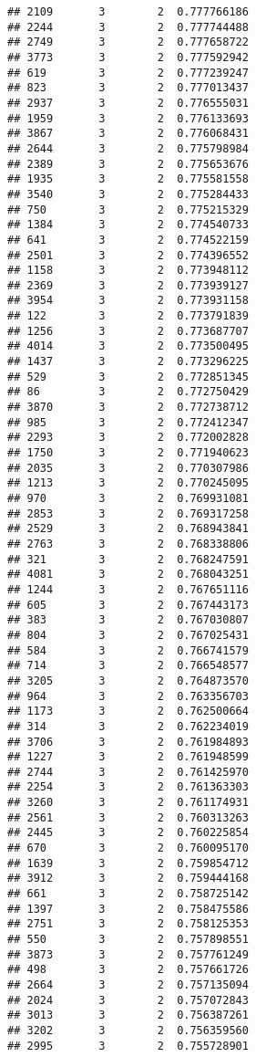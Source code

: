 \documentclass[
]{article}
\begin{document}
\begin{verbatim}
## 2109       3        2  0.777766186
## 2244       3        2  0.777744488
## 2749       3        2  0.777658722
## 3773       3        2  0.777592942
## 619        3        2  0.777239247
## 823        3        2  0.777013437
## 2937       3        2  0.776555031
## 1959       3        2  0.776133693
## 3867       3        2  0.776068431
## 2644       3        2  0.775798984
## 2389       3        2  0.775653676
## 1935       3        2  0.775581558
## 3540       3        2  0.775284433
## 750        3        2  0.775215329
## 1384       3        2  0.774540733
## 641        3        2  0.774522159
## 2501       3        2  0.774396552
## 1158       3        2  0.773948112
## 2369       3        2  0.773939127
## 3954       3        2  0.773931158
## 122        3        2  0.773791839
## 1256       3        2  0.773687707
## 4014       3        2  0.773500495
## 1437       3        2  0.773296225
## 529        3        2  0.772851345
## 86         3        2  0.772750429
## 3870       3        2  0.772738712
## 985        3        2  0.772412347
## 2293       3        2  0.772002828
## 1750       3        2  0.771940623
## 2035       3        2  0.770307986
## 1213       3        2  0.770245095
## 970        3        2  0.769931081
## 2853       3        2  0.769317258
## 2529       3        2  0.768943841
## 2763       3        2  0.768338806
## 321        3        2  0.768247591
## 4081       3        2  0.768043251
## 1244       3        2  0.767651116
## 605        3        2  0.767443173
## 383        3        2  0.767030807
## 804        3        2  0.767025431
## 584        3        2  0.766741579
## 714        3        2  0.766548577
## 3205       3        2  0.764873570
## 964        3        2  0.763356703
## 1173       3        2  0.762500664
## 314        3        2  0.762234019
## 3706       3        2  0.761984893
## 1227       3        2  0.761948599
## 2744       3        2  0.761425970
## 2254       3        2  0.761363303
## 3260       3        2  0.761174931
## 2561       3        2  0.760313263
## 2445       3        2  0.760225854
## 670        3        2  0.760095170
## 1639       3        2  0.759854712
## 3912       3        2  0.759444168
## 661        3        2  0.758725142
## 1397       3        2  0.758475586
## 2751       3        2  0.758125353
## 550        3        2  0.757898551
## 3873       3        2  0.757761249
## 498        3        2  0.757661726
## 2664       3        2  0.757135094
## 2024       3        2  0.757072843
## 3013       3        2  0.756387261
## 3202       3        2  0.756359560
## 2995       3        2  0.755728901

\end{verbatim}
\end{document}
